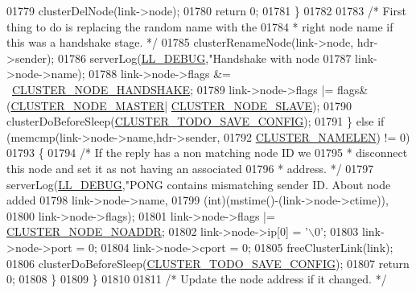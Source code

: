 \begin{DoxyCode}
{{{{{{{{{{{{{{{{{{{{{{{{{{{{01779                     clusterDelNode(link->node);
01780                     \textcolor{keywordflow}{return} 0;
01781                 \}
01782 
01783                 \textcolor{comment}{/* First thing to do is replacing the random name with the}
01784 \textcolor{comment}{                 * right node name if this was a handshake stage. */}
01785                 clusterRenameNode(link->node, hdr->sender);
01786                 serverLog(\hyperlink{server_8h_abcaffe365dee628fcf9fc90c69d534a1}{LL\_DEBUG},\textcolor{stringliteral}{"Handshake with node %
01787                     link->node->name);
01788                 link->node->flags &= ~\hyperlink{cluster_8h_a60571342a067f1e5772a04b36feff6a6}{CLUSTER\_NODE\_HANDSHAKE};
01789                 link->node->flags |= flags&(\hyperlink{cluster_8h_a5dcea846e31b55b73244aa2e496a31bf}{CLUSTER\_NODE\_MASTER}|
      \hyperlink{cluster_8h_a34b7bfd1f810397be68c3b5d13d4d134}{CLUSTER\_NODE\_SLAVE});
01790                 clusterDoBeforeSleep(\hyperlink{cluster_8h_a0ae5ff08fbae3c655012b4de8bfc327d}{CLUSTER\_TODO\_SAVE\_CONFIG});
01791             \} \textcolor{keywordflow}{else} \textcolor{keywordflow}{if} (memcmp(link->node->name,hdr->sender,
01792                         \hyperlink{cluster_8h_ace7a882972eff7149675252938643b6e}{CLUSTER\_NAMELEN}) != 0)
01793             \{
01794                 \textcolor{comment}{/* If the reply has a non matching node ID we}
01795 \textcolor{comment}{                 * disconnect this node and set it as not having an associated}
01796 \textcolor{comment}{                 * address. */}
01797                 serverLog(\hyperlink{server_8h_abcaffe365dee628fcf9fc90c69d534a1}{LL\_DEBUG},\textcolor{stringliteral}{"PONG contains mismatching sender ID. About node %
       added %
01798                     link->node->name,
01799                     (\textcolor{keywordtype}{int})(mstime()-(link->node->ctime)),
01800                     link->node->flags);
01801                 link->node->flags |= \hyperlink{cluster_8h_a2bbed8bf0615871a01ca8b7f691b56d8}{CLUSTER\_NODE\_NOADDR};
01802                 link->node->ip[0] = \textcolor{stringliteral}{'\(\backslash\)0'};
01803                 link->node->port = 0;
01804                 link->node->cport = 0;
01805                 freeClusterLink(link);
01806                 clusterDoBeforeSleep(\hyperlink{cluster_8h_a0ae5ff08fbae3c655012b4de8bfc327d}{CLUSTER\_TODO\_SAVE\_CONFIG});
01807                 \textcolor{keywordflow}{return} 0;
01808             \}
01809         \}
01810 
01811         \textcolor{comment}{/* Update the node address if it changed. */}
}}}}}}}}}}}}}}}}}}}}}}}}}}}}}}
\end{DoxyCode}
